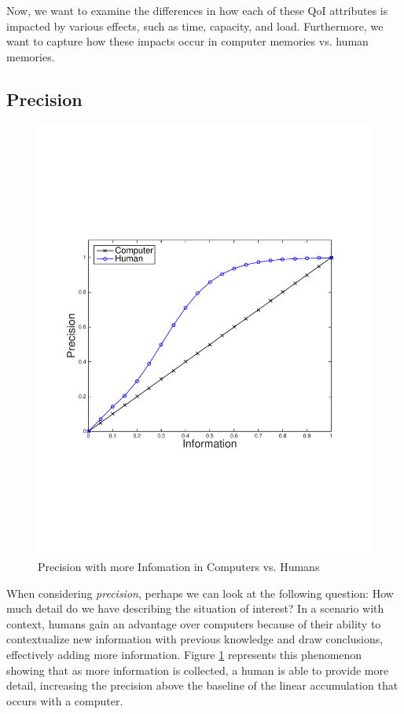 Now, we want to examine the differences in how each of these QoI attributes is impacted by various effects, such as time, capacity, and load.  Furthermore, we want to capture how these impacts occur in computer memories vs. human memories.

\subsection{Precision}

\begin{figure}
\begin{centering}
    \includegraphics[clip=true, trim = 15mm 65mm 25mm 70mm, scale=0.40]{figures/example_qoi_trends/prec_vs_info_hvc_1.pdf}
    \caption{Precision with more Infomation in Computers vs. Humans }
    \label{fig:prec_vs_info_hvc}
\end{centering}
\end{figure}

When considering \emph{precision}, perhaps we can look at the following question:  How much detail do we have describing the situation of interest? In a scenario with context, humans gain an advantage over computers because of their ability to contextualize new information with previous knowledge and draw conclusions, effectively adding more information.  Figure \ref{fig:prec_vs_info_hvc} represents this phenomenon showing that as more information is collected, a human is able to provide more detail, increasing the precision above the baseline of the linear accumulation that occurs with a computer.  

